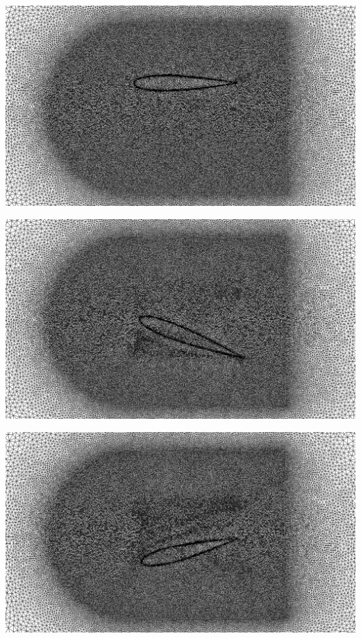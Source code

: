 \indent

\indent

\begingroup
	\begin{minipage}[t]{.5\linewidth}
		\centering
		 \includegraphics[scale=.15]{Bordeaux/figures/LSAdvection/NacaAdvNew0.png}
	\end{minipage}
	\begin{minipage}[t]{.5\linewidth}
		\centering
		 \includegraphics[scale=.15]{Bordeaux/figures/LSAdvection/NacaAdvNew10.png}
	\end{minipage}
	\begin{minipage}[t]{1.\linewidth}
		\centering
		 \includegraphics[scale=.15]{Bordeaux/figures/LSAdvection/NacaAdvNew20.png}
	\end{minipage}
\endgroup




